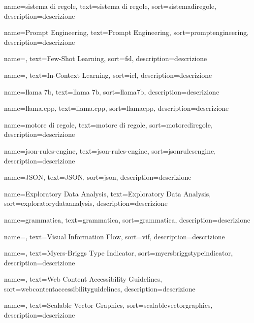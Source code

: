  {
    name=sistema di regole,
    text=sistema di regole,
    sort=sistemadiregole,
    description={descrizione}
}

 {
    name=Prompt Engineering,
    text=Prompt Engineering,
    sort=promptengineering,
    description={descrizione}
}

 {
    name=,
    text=Few-Shot Learning,
    sort=fsl,
    description={descrizione}
}

 {
    name=,
    text=In-Context Learning,
    sort=icl,
    description={descrizione}
}

 {
    name=llama 7b,
    text=llama 7b,
    sort=llama7b,
    description={descrizione}
}

 {
    name=llama.cpp,
    text=llama.cpp,
    sort=llamacpp,
    description={descrizione}
}

 {
    name=motore di regole,
    text=motore di regole,
    sort=motorediregole,
    description={descrizione}
}

 {
    name=json-rules-engine,
    text=json-rules-engine,
    sort=jsonrulesengine,
    description={descrizione}
}

 {
    name=JSON,
    text=JSON,
    sort=json,
    description={descrizione}
}

 {
    name=Exploratory Data Analysis,
    text=Exploratory Data Analysis,
    sort=exploratorydataanalysis,
    description={descrizione}
}

 {
    name=grammatica,
    text=grammatica,
    sort=grammatica,
    description={descrizione}
}

 {
    name=,
    text=Visual Information Flow,
    sort=vif,
    description={descrizione}
}


 {
    name=,
    text=Myers-Briggs Type Indicator,
    sort=myersbriggstypeindicator,
    description={descrizione}
}

 {
    name=,
    text=Web Content Accessibility Guidelines,
    sort=webcontentaccessibilityguidelines,
    description={descrizione}
}

 {
    name=,
    text=Scalable Vector Graphics,
    sort=scalablevectorgraphics,
    description={descrizione}
}

